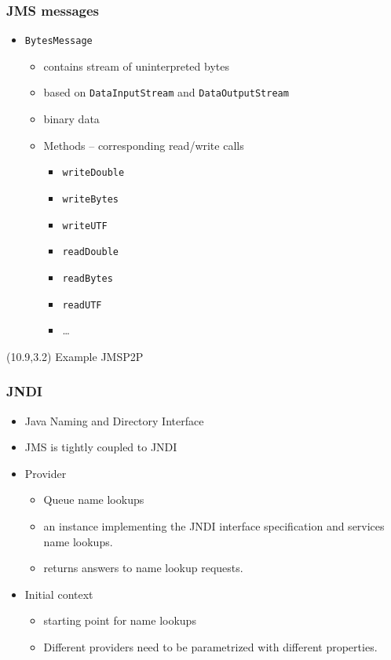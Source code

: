 \documentclass[10pt,xcolor=pdflatex]{beamer}
\begin{document}
\begin{frame}[containsverbatim]\frametitle{JMS messages}
\begin{itemize}
  \item \texttt{BytesMessage}
	\begin{itemize}
	  \item contains stream of uninterpreted bytes
	  \item based on \texttt{DataInputStream} and \texttt{DataOutputStream}
	  \item binary data
	  \item Methods – corresponding read/write calls
        \begin{itemize}
          \item \texttt{writeDouble}
	      \item \texttt{writeBytes}
          \item \texttt{writeUTF}
	      \item \texttt{readDouble}
	      \item \texttt{readBytes}
	      \item \texttt{readUTF}
	      \item \ldots
        \end{itemize}
	\end{itemize}
\end{itemize}
\begin{textblock}{5}(10.9,3.2)
    {\footnotesize Example JMSP2P}
\end{textblock}
\end{frame}


\begin{frame}[containsverbatim]\frametitle{JNDI}
\begin{itemize}
	\item Java Naming and Directory Interface
    \item JMS is tightly coupled to JNDI
	\item Provider
	  \begin{itemize}
		\item Queue name lookups
		\item an instance implementing the JNDI interface specification and services name lookups.
		\item returns answers to name lookup requests.
	  \end{itemize}
    \item Initial context
      \begin{itemize}
    	\item starting point for name lookups
		\item Different providers need to be parametrized with different properties.
      \end{itemize}
\end{itemize}
\end{frame}
\end{document}
